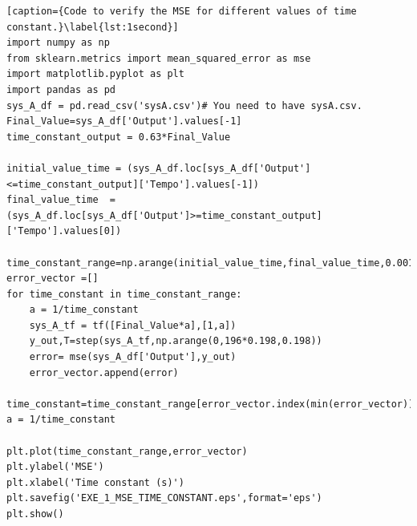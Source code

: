 \documentclass[a4paper]{article}
\begin{document}
\begin{lstlisting}[caption={Code to verify the MSE for different values of time constant.}\label{lst:1second}]
import numpy as np
from sklearn.metrics import mean_squared_error as mse
import matplotlib.pyplot as plt 
import pandas as pd
sys_A_df = pd.read_csv('sysA.csv')# You need to have sysA.csv.
Final_Value=sys_A_df['Output'].values[-1]
time_constant_output = 0.63*Final_Value

initial_value_time = (sys_A_df.loc[sys_A_df['Output']<=time_constant_output]['Tempo'].values[-1])
final_value_time  = (sys_A_df.loc[sys_A_df['Output']>=time_constant_output]['Tempo'].values[0])

time_constant_range=np.arange(initial_value_time,final_value_time,0.001)
error_vector =[]
for time_constant in time_constant_range: 
    a = 1/time_constant
    sys_A_tf = tf([Final_Value*a],[1,a])
    y_out,T=step(sys_A_tf,np.arange(0,196*0.198,0.198))
    error= mse(sys_A_df['Output'],y_out)
    error_vector.append(error)

time_constant=time_constant_range[error_vector.index(min(error_vector))]
a = 1/time_constant

plt.plot(time_constant_range,error_vector)
plt.ylabel('MSE')
plt.xlabel('Time constant (s)')
plt.savefig('EXE_1_MSE_TIME_CONSTANT.eps',format='eps')
plt.show()
\end{lstlisting}
\end{document}
